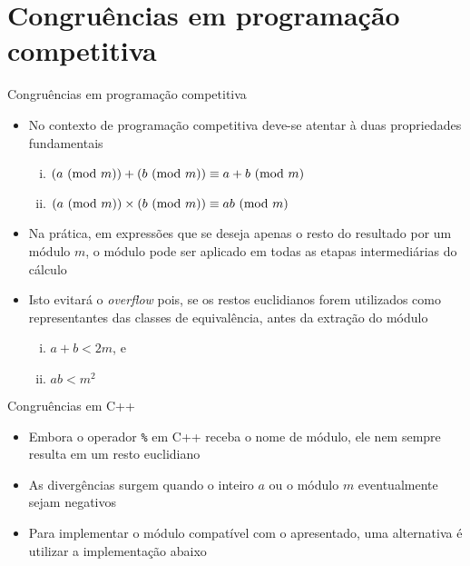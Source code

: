 \section{Congruências em programação competitiva}

\begin{frame}[fragile]{Congruências em programação competitiva}

    \begin{itemize}
        \item  No contexto de programação competitiva deve-se atentar à duas propriedades
            fundamentais
        \begin{enumerate}[(i)]
            \item $(a\ (\mbox{mod}\ m)) + (b\ (\mbox{mod}\ m))\equiv a + b\ (\mbox{mod}\ m)$
            \item $(a\ (\mbox{mod}\ m)) \times (b\ (\mbox{mod}\ m))\equiv ab\ (\mbox{mod}\ m)$
        \end{enumerate}

        \item Na prática, em expressões que se deseja apenas o resto do resultado por um módulo
            $m$, o módulo pode ser aplicado em todas as etapas intermediárias do
            cálculo

        \item Isto evitará o \textit{overflow} pois, se os restos euclidianos forem utilizados
            como representantes das classes de equivalência, antes da extração do módulo
        \begin{enumerate}[(i)]
            \item $a + b < 2m$, e
            \item $ab < m^2$
        \end{enumerate}

    \end{itemize}

\end{frame}

\begin{frame}[fragile]{Congruências em C++}

    \begin{itemize}
        \item Embora o operador \texttt{\%} em C++ receba o nome de módulo, ele nem sempre 
            resulta em um resto euclidiano

        \item As divergências surgem quando o inteiro $a$ ou o módulo $m$ eventualmente sejam
            negativos

        \item Para implementar o módulo compatível com o apresentado, uma alternativa
            é utilizar a implementação abaixo

    \end{itemize}

\end{frame}

